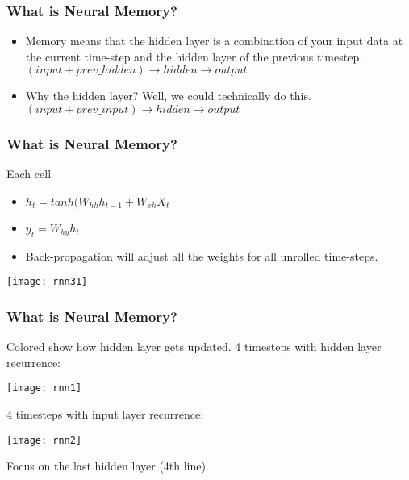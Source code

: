 \begin{frame}[fragile] \frametitle{What is Neural Memory?}
\begin{itemize}
\item Memory means that the hidden layer is a combination of your input data at the current time-step and the hidden layer of the previous timestep.
$ (input + prev\_hidden) \rightarrow hidden \rightarrow output$
\item Why the hidden layer? Well, we could technically do this. 
$(input + prev\_input) \rightarrow hidden \rightarrow output$
\end{itemize}
\end{frame}


\begin{frame}[fragile] \frametitle{What is Neural Memory?}
Each cell
\begin{itemize}
\item $h_t = tanh(W_{hh}h_{t-1} + W_{xh}X_t$
\item $y_t = W_{hy}h_t$
\item Back-propagation will adjust all the weights for all unrolled time-steps.
\end{itemize}


\begin{center}
\texttt{[image: rnn31]}
\end{center}
\end{frame}


\begin{frame}[fragile] \frametitle{What is Neural Memory?}
Colored show how hidden layer gets updated. 
4 timesteps with hidden layer recurrence:
\begin{center}
\texttt{[image: rnn1]}
\end{center}
4 timesteps with input  layer recurrence:
\begin{center}
\texttt{[image: rnn2]}
\end{center}
Focus on the last hidden layer (4th line).
\end{frame}

